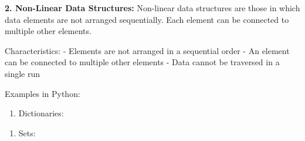 \begin{Shaded}
\begin{Highlighting}[]
\OperatorTok{=}\NormalTok{ deque([}\NormalTok{, }\NormalTok{, }\NormalTok{])}
\NormalTok{)}
\end{Highlighting}
\end{Shaded}

\textbf{2. Non-Linear Data Structures:} Non-linear data structures are
those in which data elements are not arranged sequentially. Each element
can be connected to multiple other elements.

Characteristics: - Elements are not arranged in a sequential order - An
element can be connected to multiple other elements - Data cannot be
traversed in a single run

Examples in Python:

\begin{enumerate}
\def\labelenumi{\alph{enumi})}
\tightlist
\item
  Dictionaries:
\end{enumerate}

\begin{Shaded}
\begin{Highlighting}[]
\OperatorTok{=}\NormalTok{ \{}\NormalTok{: }\NormalTok{, }\NormalTok{: }\NormalTok{\}}
\NormalTok{(person[}\NormalTok{])  }
\end{Highlighting}
\end{Shaded}

\begin{enumerate}
\def\labelenumi{\alph{enumi})}
\setcounter{enumi}{1}
\tightlist
\item
  Sets:
\end{enumerate}

\begin{Shaded}
\begin{Highlighting}[]
\OperatorTok{=}\NormalTok{ \{}\NormalTok{, }\NormalTok{, }\NormalTok{, }\NormalTok{, }\NormalTok{\}}
\NormalTok{)}
\end{Highlighting}
\end{Shaded}

